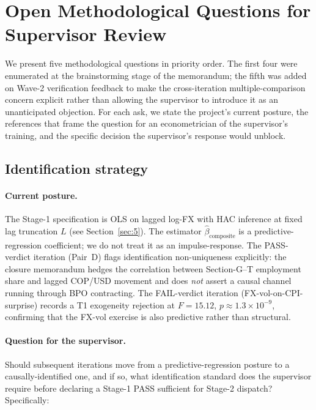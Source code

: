 \section{Open Methodological Questions for Supervisor Review}\label{sec:7}

We present five methodological questions in priority order. The first four
were enumerated at the brainstorming stage of the memorandum; the fifth
was added on Wave-2 verification feedback to make the cross-iteration
multiple-comparison concern explicit rather than allowing the supervisor
to introduce it as an unanticipated objection. For each ask, we state the
project's current posture, the references that frame the question for an
econometrician of the supervisor's training, and the specific decision
the supervisor's response would unblock.

\subsection{Identification strategy}\label{sec:7.1}

\paragraph{Current posture.} The Stage-1 specification is OLS on lagged
log-FX with HAC inference at fixed lag truncation \(L\) (see
Section~\ref{sec:5}). The estimator \(\hat{\beta}_{\mathrm{composite}}\) is
a predictive-regression coefficient; we do not treat it as an
impulse-response. The PASS-verdict iteration (Pair~D) flags identification
non-uniqueness explicitly: the closure memorandum hedges the correlation
between Section-G--T employment share and lagged COP/USD movement and does
\emph{not} assert a causal channel running through BPO contracting. The
FAIL-verdict iteration (FX-vol-on-CPI-surprise) records a T1 exogeneity
rejection at \(F = 15.12\), \(p \approx 1.3 \times 10^{-9}\), confirming
that the FX-vol exercise is also predictive rather than structural.

\paragraph{Question for the supervisor.} Should subsequent iterations move
from a predictive-regression posture to a causally-identified one, and if
so, what identification standard does the supervisor require before
declaring a Stage-1 PASS sufficient for Stage-2 dispatch? Specifically:

